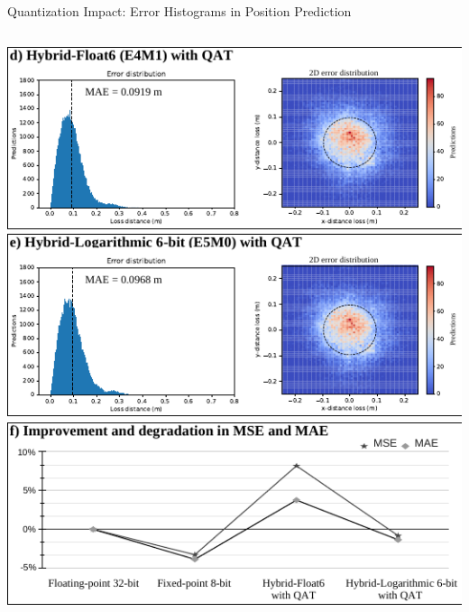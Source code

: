 \begin{frame}{Quantization Impact: Error Histograms in Position Prediction}
\begin{columns}[T]
		\begin{column}{0.5\textwidth}
			\centering
			\includegraphics[width=0.95\linewidth]{slides/figures/model_evaluation_d.pdf} %
			\pause %
			\includegraphics[width=0.95\linewidth]{slides/figures/model_evaluation_e.pdf} %
			\pause %
			\includegraphics[width=0.95\linewidth]{slides/figures/model_evaluation_f.pdf} %
		\end{column}
	\end{columns}
\end{frame}

